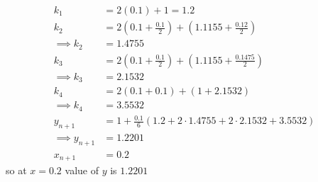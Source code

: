 \documentclass[journal,12pt,twocolumn]{IEEEtran}
\theoremstyle{remark}
\begin{document}
\begin{align}
    k_1&=2(0.1)+1=1.2\\
    k_2&=2(0.1+\frac{0.1}{2})+(1.1155+\frac{0.12}{2})\\
    \implies k_2&= 1.4755\\
    k_3&=2(0.1+\frac{0.1}{2})+(1.1155+\frac{0.1475}{2})\\
    \implies k_3&=2.1532\\
    k_4&=2(0.1+0.1)+(1+2.1532)\\
    \implies k_4&=3.5532\\
     y_{n+1}&=1+\frac{0.1}{6}(1.2+2\cdot1.4755+2\cdot2.1532+3.5532)\\
     \implies y_{n+1}&=1.2201\\
     x_{n+1}&=0.2
\end{align}
so at $x=0.2$ value of $y$ is $1.2201$
\end{document}
